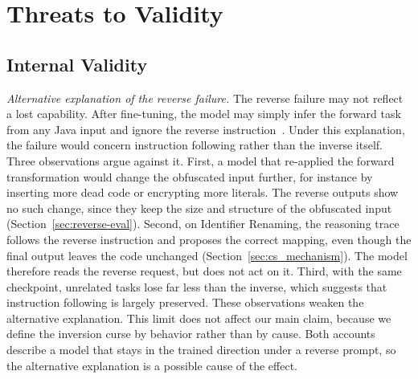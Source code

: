 \section{Threats to Validity}
\label{sec:threats}

\subsection{Internal Validity}


\textit{Alternative explanation of the reverse failure.}
The reverse failure may not reflect a lost capability.
After fine-tuning, the model may simply infer the forward task from any Java input and ignore the reverse instruction~\cite{kotha2024implicit}.
Under this explanation, the failure would concern instruction following rather than the inverse itself.
Three observations argue against it.
First, a model that re-applied the forward transformation would change the obfuscated input further, for instance by inserting more dead code or encrypting more literals.
The reverse outputs show no such change, since they keep the size and structure of the obfuscated input (Section~\ref{sec:reverse-eval}).
Second, on Identifier Renaming, the reasoning trace follows the reverse instruction and proposes the correct mapping, even though the final output leaves the code unchanged (Section~\ref{sec:cs_mechanism}).
The model therefore reads the reverse request, but does not act on it.
Third, with the same checkpoint, unrelated tasks lose far less than the inverse, which suggests that instruction following is largely preserved.
These observations weaken the alternative explanation.
This limit does not affect our main claim, because we define the inversion curse by behavior rather than by cause.
Both accounts describe a model that stays in the trained direction under a reverse prompt, so the alternative explanation is a possible cause of the effect.

